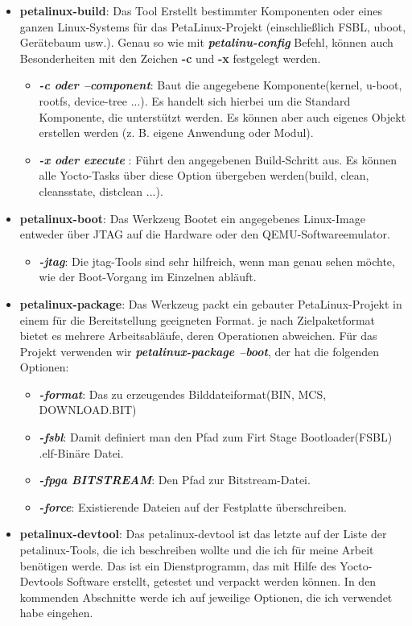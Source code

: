 \begin{itemize}
	\item \textbf{petalinux-build}: Das Tool Erstellt bestimmter Komponenten oder eines ganzen Linux-Systems für das PetaLinux-Projekt (einschließlich FSBL, uboot, Gerätebaum usw.). Genau so wie mit \textbf{\emph{petalinu-config}} Befehl, können auch Besonderheiten mit den Zeichen \textbf{-c} und \textbf{-x} festgelegt werden. 
	\begin{itemize}
		\item \textbf{\emph{-c oder --component}}: Baut die angegebene Komponente(kernel, u-boot, rootfs, device-tree ...). Es handelt sich hierbei um die Standard Komponente, die unterstützt werden. Es können aber auch eigenes Objekt erstellen werden (z. B. eigene Anwendung oder Modul). 
		\item \textbf{\emph{-x oder execute }}: Führt den angegebenen Build-Schritt aus. Es können alle Yocto-Tasks über diese Option übergeben werden(build, clean, cleansstate, distclean ...).
	\end{itemize}
	\item \textbf{petalinux-boot}: Das Werkzeug Bootet ein angegebenes Linux-Image entweder über JTAG auf die Hardware oder den QEMU-Softwareemulator.
	\begin{itemize}
		\item \textbf{\emph{-jtag}}: Die jtag-Tools sind sehr hilfreich, wenn man genau sehen möchte, wie der Boot-Vorgang im Einzelnen abläuft. 
	\end{itemize}
	\item \textbf{petalinux-package}: Das Werkzeug packt ein gebauter PetaLinux-Projekt in einem für die Bereitstellung geeigneten Format. je nach Zielpaketformat bietet es mehrere Arbeitsabläufe, deren Operationen abweichen. Für das Projekt verwenden wir  \textbf{\emph{	petalinux-package --boot}}, der hat die folgenden Optionen:
	\begin{itemize}
		\item \textbf{\emph{-format}}: Das zu erzeugendes Bilddateiformat(BIN, MCS,  DOWNLOAD.BIT)	
		
		\item \textbf{\emph{-fsbl}}: Damit definiert man den Pfad zum Firt Stage Bootloader(FSBL) .elf-Binäre Datei.
		
		\item \textbf{\emph{-fpga BITSTREAM}}: Den Pfad zur Bitstream-Datei.
		
		\item  \textbf{\emph{-force}}: Existierende Dateien auf der Festplatte überschreiben. 
	\end{itemize}
	\item \textbf{petalinux-devtool}: Das petalinux-devtool ist das letzte auf der Liste der petalinux-Tools, die ich beschreiben wollte und die ich für meine Arbeit benötigen werde. Das ist ein Dienstprogramm, das mit Hilfe des Yocto-Devtools Software erstellt, getestet und verpackt werden können. In den kommenden Abschnitte werde ich auf jeweilige Optionen, die ich verwendet habe eingehen. 
	
\end{itemize}

